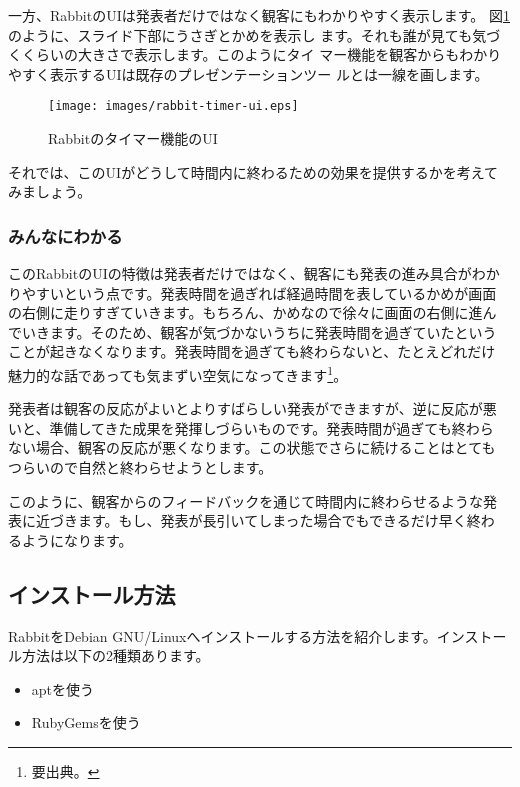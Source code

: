\documentclass[mingoth,a4paper]{jsarticle}
\begin{document}
一方、RabbitのUIは発表者だけではなく観客にもわかりやすく表示します。
図\ref{fig:rabbit-timer-ui}のように、スライド下部にうさぎとかめを表示し
ます。それも誰が見ても気づくくらいの大きさで表示します。このようにタイ
マー機能を観客からもわかりやすく表示するUIは既存のプレゼンテーションツー
ルとは一線を画します。

\begin{figure}[ht]
  \begin{center}
    \texttt{[image: images/rabbit-timer-ui.eps]}
  \end{center}
  \caption{Rabbitのタイマー機能のUI}
  \label{fig:rabbit-timer-ui}
\end{figure}

それでは、このUIがどうして時間内に終わるための効果を提供するかを考えて
みましょう。

\subsubsection{みんなにわかる}

このRabbitのUIの特徴は発表者だけではなく、観客にも発表の進み具合がわか
りやすいという点です。発表時間を過ぎれば経過時間を表しているかめが画面
の右側に走りすぎていきます。もちろん、かめなので徐々に画面の右側に進ん
でいきます。そのため、観客が気づかないうちに発表時間を過ぎていたという
ことが起きなくなります。発表時間を過ぎても終わらないと、たとえどれだけ
魅力的な話であっても気まずい空気になってきます\footnote{要出典。}。

発表者は観客の反応がよいとよりすばらしい発表ができますが、逆に反応が悪
いと、準備してきた成果を発揮しづらいものです。発表時間が過ぎても終わら
ない場合、観客の反応が悪くなります。この状態でさらに続けることはとても
つらいので自然と終わらせようとします。

このように、観客からのフィードバックを通じて時間内に終わらせるような発
表に近づきます。もし、発表が長引いてしまった場合でもできるだけ早く終わ
るようになります。

\subsection{インストール方法}

RabbitをDebian GNU/Linuxへインストールする方法を紹介します。インストー
ル方法は以下の2種類あります。

\begin{itemize}
\item aptを使う
\item RubyGemsを使う
\end{itemize}
\end{document}
